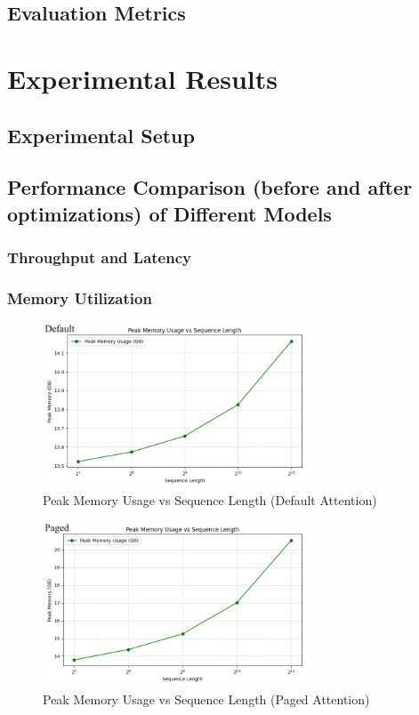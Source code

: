 \documentclass[11pt]{article}
\begin{document}
  \subsection{Evaluation Metrics}

\section{Experimental Results}
  \subsection{Experimental Setup}

  \subsection{Performance Comparison (before and after optimizations) of Different Models}
  \subsubsection{Throughput and Latency}
  \subsubsection{Memory Utilization}
  \begin{figure}[h]
    \centering
    \includegraphics[width=0.7\textwidth]{../profile_memory_default_plot.png}
    \caption{Peak Memory Usage vs Sequence Length (Default Attention)}
  \end{figure}
  \begin{figure}[h]
    \centering
    \includegraphics[width=0.7\textwidth]{../profile_memory_paged_plot.png}
    \caption{Peak Memory Usage vs Sequence Length (Paged Attention)}
  \end{figure}
\end{document}
